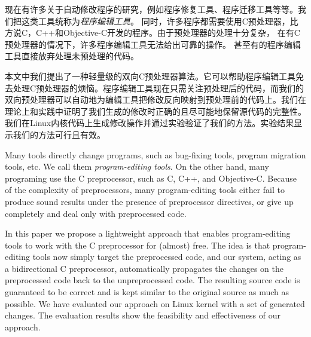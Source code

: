 
\begin{cabstract}
现在有许多关于自动修改程序的研究，例如程序修复工具、程序迁移工具等等。我们把这类工具统称为\emph{程序编辑工具}。
同时，许多程序都需要使用C预处理器，比方说C，C++和Objective-C开发的程序。由于预处理器的处理十分复杂，
在有C预处理器的情况下，许多程序编辑工具无法给出可靠的操作。
甚至有的程序编辑工具直接放弃处理未预处理的代码。

本文中我们提出了一种轻量级的双向C预处理器算法。它可以帮助程序编辑工具免去处理C预处理器的烦恼。程序编辑工具现在只需关注预处理后的代码，而我们的双向预处理器可以自动地为编辑工具把修改反向映射到预处理前的代码上。我们在理论上和实践中证明了我们生成的修改时正确的且尽可能地保留源代码的完整性。我们在Linux内核代码上生成修改操作并通过实验验证了我们的方法。实验结果显示我们的方法可行且有效。
\end{cabstract}

\begin{eabstract}
Many tools directly change programs, such as bug-fixing tools, program migration tools, etc. We call them \emph{program-editing tools}. On the other hand, many programing use the C preprocessor, such as C, C++, and Objective-C. Because of the complexity of preprocessors, many program-editing tools either fail to produce sound results under the presence of preprocessor directives, or give up completely and deal only with preprocessed code.

In this paper we propose a lightweight approach that enables program-editing tools to work with the C preprocessor for (almost) free. The idea is that program-editing tools now simply target the preprocessed code, and our system, acting as a bidirectional C preprocessor, automatically propagates the changes on the preprocessed code back to the unpreprocessed code. The resulting source code is guaranteed to be correct and is kept similar to the original source as much as possible. We have evaluated our approach on Linux kernel with a set of generated changes. The evaluation results show the feasibility and effectiveness of our approach.
\end{eabstract}

